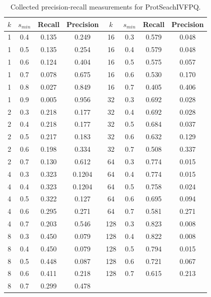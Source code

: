 \documentclass[twoside,a4paper]{master}
\begin{document}
\begin{table}
\begin{center}
\begin{tabular}{|c|c|c|c|c|c|c|c|}
\hline
\(k\) & \(s_{min}\) & Recall & Precision & \(k\) & \(s_{min}\) & Recall & Precision \\
\hline
1&0.4&0.135&0.249&16&0.3&0.579&0.048\\
1&0.5&0.135&0.254&16&0.4&0.579&0.048\\
1&0.6&0.124&0.404&16&0.5&0.575&0.057\\
1&0.7&0.078&0.675&16&0.6&0.530&0.170\\
1&0.8&0.027&0.849&16&0.7&0.405&0.406\\
1&0.9&0.005&0.956&32&0.3&0.692&0.028\\
2&0.3&0.218&0.177&32&0.4&0.692&0.028\\
2&0.4&0.218&0.177&32&0.5&0.684&0.037\\
2&0.5&0.217&0.183&32&0.6&0.632&0.129\\
2&0.6&0.198&0.334&32&0.7&0.508&0.337\\
2&0.7&0.130&0.612&64&0.3&0.774&0.015\\
4&0.3&0.323&0.1204&64&0.4&0.774&0.015\\
4&0.4&0.323&0.1204&64&0.5&0.758&0.024\\
4&0.5&0.322&0.127&64&0.6&0.695&0.094\\
4&0.6&0.295&0.271&64&0.7&0.581&0.271\\
4&0.7&0.203&0.546&128&0.3&0.823&0.008\\
8&0.3&0.450&0.079&128&0.4&0.822&0.008\\
8&0.4&0.450&0.079&128&0.5&0.794&0.015\\
8&0.5&0.448&0.087&128&0.6&0.721&0.067\\
8&0.6&0.411&0.218&128&0.7&0.615&0.213\\
8&0.7&0.299&0.478&&&&\\
\hline
\end{tabular}
\caption{Collected precision-recall measurements for ProtSeachIVFPQ.}
\label{tab:pr_ivfpq}
\end{center}
\end{table}


\Assertion
\end{document}
